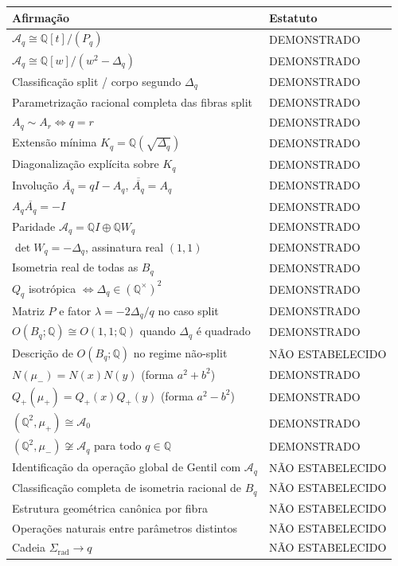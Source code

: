 \documentclass[11pt,a4paper]{article}
\begin{document}
\begin{center}
\begin{tabular}{@{}p{}p{}@{}}
\toprule
Afirmação & Estatuto \\
\midrule
\(\mathcal{A}_q\cong\mathbb{Q}[t]/(P_q)\) & DEMONSTRADO \\
\(\mathcal{A}_q\cong\mathbb{Q}[w]/(w^2-\Delta_q)\) & DEMONSTRADO \\
Classificação split / corpo segundo \(\Delta_q\) & DEMONSTRADO \\
Parametrização racional completa das fibras split & DEMONSTRADO \\
\(A_q\sim A_r\Leftrightarrow q=r\) & DEMONSTRADO \\
Extensão mínima \(K_q=\mathbb{Q}(\sqrt{\Delta_q})\) & DEMONSTRADO \\
Diagonalização explícita sobre \(K_q\) & DEMONSTRADO \\
Involução \(\overline{A_q}=qI-A_q\), \(\overline{\overline{A_q}}=A_q\) & DEMONSTRADO \\
\(A_q\overline{A_q}=-I\) & DEMONSTRADO \\
Paridade \(\mathcal{A}_q=\mathbb{Q}I\oplus\mathbb{Q}W_q\) & DEMONSTRADO \\
\(\det W_q=-\Delta_q\), assinatura real \((1,1)\) & DEMONSTRADO \\
Isometria real de todas as \(B_q\) & DEMONSTRADO \\
\(Q_q\) isotrópica \(\Leftrightarrow\Delta_q\in(\mathbb{Q}^\times)^2\) & DEMONSTRADO \\
Matriz \(P\) e fator \(\lambda=-2\Delta_q/q\) no caso split & DEMONSTRADO \\
\(O(B_q;\mathbb{Q})\cong O(1,1;\mathbb{Q})\) quando \(\Delta_q\) é quadrado & DEMONSTRADO \\
Descrição de \(O(B_q;\mathbb{Q})\) no regime não-split & NÃO ESTABELECIDO \\
\(N(\mu_-)=N(x)N(y)\) (forma \(a^2+b^2\)) & DEMONSTRADO \\
\(Q_+(\mu_+)=Q_+(x)Q_+(y)\) (forma \(a^2-b^2\)) & DEMONSTRADO \\
\((\mathbb{Q}^2,\mu_+)\cong\mathcal{A}_0\) & DEMONSTRADO \\
\((\mathbb{Q}^2,\mu_-)\not\cong\mathcal{A}_q\) para todo \(q\in\mathbb{Q}\) & DEMONSTRADO \\
Identificação da operação global de Gentil com \(\mathcal{A}_q\) & NÃO ESTABELECIDO \\
Classificação completa de isometria racional de \(B_q\) & NÃO ESTABELECIDO \\
Estrutura geométrica canônica por fibra & NÃO ESTABELECIDO \\
Operações naturais entre parâmetros distintos & NÃO ESTABELECIDO \\
Cadeia \(\Sigma_{\mathrm{rad}}\to q\) & NÃO ESTABELECIDO \\
\bottomrule
\end{tabular}
\end{center}
\end{document}
